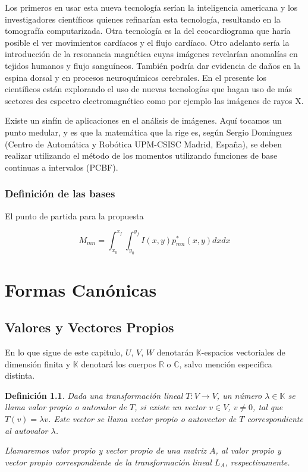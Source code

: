 \documentclass[b5paper, 11pt]{book}
\newcommand{\0}{\mathbf{0}}
\theoremstyle{estiloB}
\theoremstyle{estiloC}
\theoremstyle{estiloD}
\newtheorem{definition}{Definición}[section]
\begin{document}
Los primeros en usar esta nueva tecnología serían la inteligencia americana y los investigadores científicos quienes refinarían esta tecnología, resultando en la tomografía computarizada. Otra tecnología es la del ecocardiograma que haría posible el ver movimientos cardíacos y el flujo cardíaco. Otro adelanto sería la introducción de la resonancia magnética cuyas imágenes revelarían anomalías en tejidos humanos y flujo sanguíneos. También podría dar evidencia de daños en la espina dorsal y en procesos neuroquímicos cerebrales. En el presente los científicos están explorando el uso de nuevas tecnologías que hagan uso de más sectores des espectro electromagnético como por ejemplo las imágenes de rayos X.

Existe un sinfín de aplicaciones en el análisis de imágenes. Aquí tocamos un punto medular, y es que la matemática que la rige es, según Sergio Domínguez (Centro de Automática y Robótica UPM-CSISC Madrid, España),  se deben realizar utilizando el método de los momentos utilizando funciones de base continuas a intervalos (PCBF).

\subsection{Definición de las bases}

El punto de partida para la propuesta

\[
M_{mn}= \int_{x_0}^{x_f} \int_{y_0}^{y_f} I(x,y)p_{mn}^{*} (x,y) dx dx
\]

\chapter{Formas Canónicas}

\section{Valores y Vectores Propios}

En lo que sigue de este capitulo, $U$, $V$, $W$ denotarán $\mathbb{K}$-espacios vectoriales de dimensión finita y $\mathbb{K}$ denotará los cuerpos $\mathbb{R}$ o $\mathbb{C}$, salvo mención especifica distinta.

\begin{definition}
	Dada una transformación lineal $T\colon V \rightarrow{V}$, un número $\lambda\in\mathbb{K}$ se llama \emph{valor propio} o \emph{autovalor} de $T$, si existe un vector $v\in V$, $v\neq0$, tal que $T(v)=\lambda v$. Este vector se llama \emph{vector propio} o \emph{autovector} de $T$ correspondiente al autovalor $\lambda$.
	
	Llamaremos valor propio y vector propio de una matriz $A$, al valor propio y vector propio correspondiente de la transformación lineal $L_{A}$, respectivamente.
\end{definition}
\end{document}
